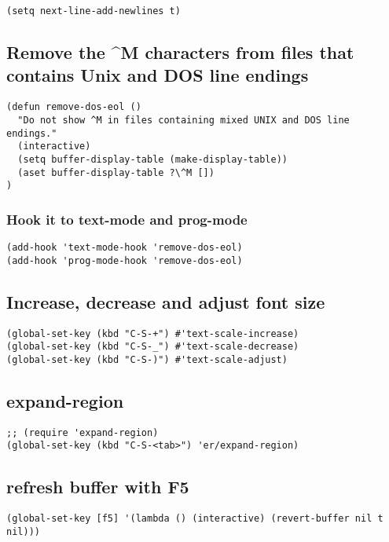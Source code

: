\documentclass[11pt]{article}
\begin{document}
\begin{verbatim}
(setq next-line-add-newlines t)
\end{verbatim}

\subsection*{Remove the \^{}M characters from files that contains Unix and DOS line endings}
\label{sec:org34f0739}

\begin{verbatim}
(defun remove-dos-eol ()
  "Do not show ^M in files containing mixed UNIX and DOS line endings."
  (interactive)
  (setq buffer-display-table (make-display-table))
  (aset buffer-display-table ?\^M [])
)
\end{verbatim}

\subsubsection*{Hook it to text-mode and prog-mode}
\label{sec:orgc0bf3b9}
\begin{verbatim}
(add-hook 'text-mode-hook 'remove-dos-eol)
(add-hook 'prog-mode-hook 'remove-dos-eol)
\end{verbatim}

\subsection*{Increase, decrease and adjust font size}
\label{sec:org768151b}

\begin{verbatim}
(global-set-key (kbd "C-S-+") #'text-scale-increase)
(global-set-key (kbd "C-S-_") #'text-scale-decrease)
(global-set-key (kbd "C-S-)") #'text-scale-adjust)
\end{verbatim}

\subsection*{expand-region}
\label{sec:org697d647}
\begin{verbatim}
;; (require 'expand-region)
(global-set-key (kbd "C-S-<tab>") 'er/expand-region)
\end{verbatim}

\subsection*{refresh buffer with F5}
\label{sec:orgefd29e2}
\begin{verbatim}
(global-set-key [f5] '(lambda () (interactive) (revert-buffer nil t nil)))
\end{verbatim}
\end{document}
